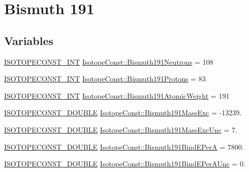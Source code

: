 \hypertarget{group___isotope_const-_bismuth-_bi191}{}\section{Bismuth 191}
\label{group___isotope_const-_bismuth-_bi191}
\subsection*{Variables}
\begin{DoxyCompactItemize}
\item 
\mbox{\hyperlink{group___isotope_const-_macros_ga5f18360b3e99483a35c32d789e62621c}{I\+S\+O\+T\+O\+P\+E\+C\+O\+N\+S\+T\+\_\+\+I\+NT}} \mbox{\hyperlink{group___isotope_const-_bismuth-_bi191_gaf8048c100636cfb1b13b5b9bfdb469e4}{Isotope\+Const\+::\+Bismuth191\+Neutrons}} = 108
\item 
\mbox{\hyperlink{group___isotope_const-_macros_ga5f18360b3e99483a35c32d789e62621c}{I\+S\+O\+T\+O\+P\+E\+C\+O\+N\+S\+T\+\_\+\+I\+NT}} \mbox{\hyperlink{group___isotope_const-_bismuth-_bi191_ga0da0d835cf2452d578405e5e2497db56}{Isotope\+Const\+::\+Bismuth191\+Protons}} = 83
\item 
\mbox{\hyperlink{group___isotope_const-_macros_ga5f18360b3e99483a35c32d789e62621c}{I\+S\+O\+T\+O\+P\+E\+C\+O\+N\+S\+T\+\_\+\+I\+NT}} \mbox{\hyperlink{group___isotope_const-_bismuth-_bi191_gab0799338017e46621afd7f3723e1e69d}{Isotope\+Const\+::\+Bismuth191\+Atomic\+Weight}} = 191
\item 
\mbox{\hyperlink{group___isotope_const-_macros_ga8f45a7272ce02c0b4c65c44636ed719a}{I\+S\+O\+T\+O\+P\+E\+C\+O\+N\+S\+T\+\_\+\+D\+O\+U\+B\+LE}} \mbox{\hyperlink{group___isotope_const-_bismuth-_bi191_ga8ebf256047a89869e9ee5e7b75e98cb8}{Isotope\+Const\+::\+Bismuth191\+Mass\+Exc}} = -\/13239.
\item 
\mbox{\hyperlink{group___isotope_const-_macros_ga8f45a7272ce02c0b4c65c44636ed719a}{I\+S\+O\+T\+O\+P\+E\+C\+O\+N\+S\+T\+\_\+\+D\+O\+U\+B\+LE}} \mbox{\hyperlink{group___isotope_const-_bismuth-_bi191_ga5f05819a0536f6f0522ace6eee58fc10}{Isotope\+Const\+::\+Bismuth191\+Mass\+Exc\+Unc}} = 7.
\item 
\mbox{\hyperlink{group___isotope_const-_macros_ga8f45a7272ce02c0b4c65c44636ed719a}{I\+S\+O\+T\+O\+P\+E\+C\+O\+N\+S\+T\+\_\+\+D\+O\+U\+B\+LE}} \mbox{\hyperlink{group___isotope_const-_bismuth-_bi191_ga5b7503fceed29262aec7bf584b02d215}{Isotope\+Const\+::\+Bismuth191\+Bind\+E\+PerA}} = 7800.
\item 
\mbox{\hyperlink{group___isotope_const-_macros_ga8f45a7272ce02c0b4c65c44636ed719a}{I\+S\+O\+T\+O\+P\+E\+C\+O\+N\+S\+T\+\_\+\+D\+O\+U\+B\+LE}} \mbox{\hyperlink{group___isotope_const-_bismuth-_bi191_gadeb7dc86f827857a2a552b97b73f0251}{Isotope\+Const\+::\+Bismuth191\+Bind\+E\+Per\+A\+Unc}} = 0.

\end{DoxyCompactItemize}
